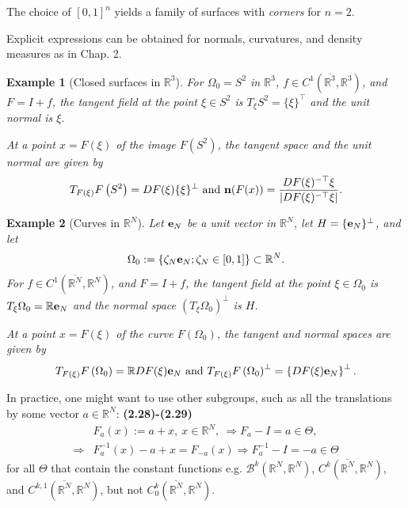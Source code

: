 \documentclass{book}
\numberwithin{equation}{section}
\newtheorem{example}{Example}[section]
\begin{document}
\begin{enumerate}
    The choice of $[0,1]^n$ yields a family of surfaces with \textit{corners} for $n = 2$.
    
    Explicit expressions can be obtained for normals, curvatures, and density measures as in Chap. 2.
    
    \begin{example}[Closed surfaces in $\mathbb{R}^3$]
        For $\Omega_0 = S^2$ in $\mathbb{R}^3$, $f\in C^1(\overline{\mathbb{R}^3},\mathbb{R}^3)$, and $F = I + f$, the tangent field at the point $\xi\in S^2$ is $T_\xi S^2 = \{\xi\}^\top$ and the unit normal is $\xi$.
        
        At a point $x = F(\xi)$ of the image $F(S^2)$, the tangent space and the unit normal are given by
        \begin{align*}
            T_{F(\xi)}F\left(S^2\right) = DF(\xi)\{\xi\}^\bot \mbox{ and } {\bf n}(F(x)) = \frac{DF(\xi)^{-\top}\xi}{\left|DF(\xi)^{-\top}\xi\right|}.
        \end{align*}
    \end{example}
    
    \begin{example}[Curves in $\mathbb{R}^N$]
        Let ${\bf e}_N$ be a unit vector in $\mathbb{R}^N$, let $H = \{{\bf e}_N\}^\bot$, and let
        \begin{align*}
            \Omega_0 := \left\{\zeta_N{\bf e}_N;\zeta_N\in[0,1]\right\}\subset\mathbb{R}^N.
        \end{align*}
        For $f\in C^1(\overline{\mathbb{R}^N},\mathbb{R}^N)$, and $F = I + f$, the tangent field at the point $\xi\in\Omega_0$ is $T_\xi\Omega_0 = \mathbb{R}{\bf e}_N$ and the normal space $(T_\xi\Omega_0)^\bot$ is $H$.
        
        At a point $x = F(\xi)$ of the curve $F(\Omega_0)$, the tangent and normal spaces are given by
        \begin{align*}
            T_{F(\xi)}F\left(\Omega_0\right) = \mathbb{R}DF(\xi){\bf e}_N \mbox{ and } T_{F(\xi)}F\left(\Omega_0\right)^\bot = \left\{DF(\xi){\bf e}_N\right\}^\bot.
        \end{align*}
    \end{example}
    In practice, one might want to use other subgroups, such as all the translations by some vector $a\in\mathbb{R}^N$: \textbf{(2.28)-(2.29)}
    \begin{align*}
        &F_a(x) := a + x,\ x\in\mathbb{R}^N,\ \Rightarrow F_a - I = a\in\Theta,\\
        \Rightarrow &F_a^{-1}(x) - a + x = F_{-a}(x) \Rightarrow F_a^{-1} - I = -a\in\Theta
    \end{align*}
    for all $\Theta$ that contain the constant functions e.g. $\mathcal{B}^k(\mathbb{R}^N,\mathbb{R}^N)$, $C^k(\overline{\mathbb{R}^N},\mathbb{R}^N)$, and $C^{k,1}(\overline{\mathbb{R}^N},\mathbb{R}^N)$, but not $C_0^k(\overline{\mathbb{R}^N},\mathbb{R}^N)$.
    

\end{enumerate}
\end{document}
